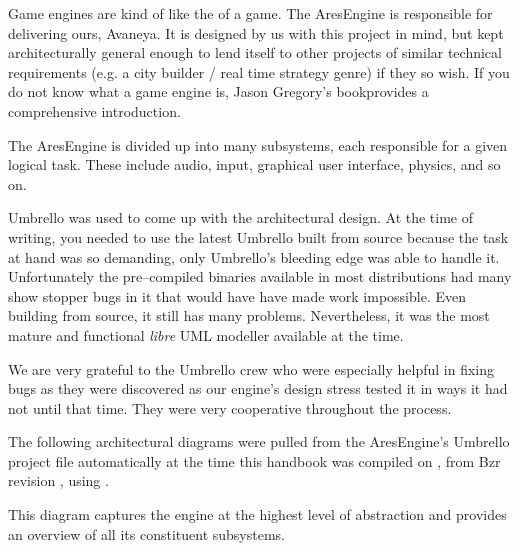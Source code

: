 

Game engines are kind of like the  of a game. The AresEngine is responsible for delivering ours, Avaneya. It is designed by us with this project in mind, but kept architecturally general enough to lend itself to other projects of similar technical requirements (e.g. a city builder / real time strategy genre) if they so wish. If you do not know what a game engine is, Jason Gregory's book provides a comprehensive introduction.
    {}

The AresEngine is divided up into many subsystems, each responsible for a given logical task. These include audio, input, graphical user interface, physics, and so on.

Umbrello was used to come up with the architectural design. At the time of writing, you needed to use the latest Umbrello built from source because the task at hand was so demanding, only Umbrello's bleeding edge was able to handle it. Unfortunately the pre--compiled binaries available in most distributions had many show stopper bugs in it that would have have made work impossible. Even building from source, it still has many problems. Nevertheless, it was the most mature and functional {\it libre} UML modeller available at the time. 

We are very grateful to the Umbrello crew who were especially helpful in fixing bugs as they were discovered as our engine's design stress tested it in ways it had not until that time. They were very cooperative throughout the process.

The following architectural diagrams were pulled from the AresEngine's Umbrello project file automatically at the time this handbook was compiled on \currentdate, from Bzr revision \BzrRevisionClickable, using \UmbrelloVersion.

This diagram captures the engine at the highest level of abstraction and provides an overview of all its constituent subsystems.

